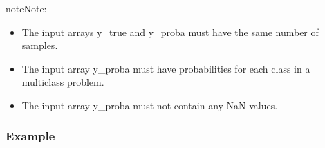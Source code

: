 \documentclass[letterpaper,10pt,english]{sphinxmanual}
\begin{document}
\begin{fulllineitems}
\begin{quote}
\begin{description}
\begin{itemize}
\end{itemize}

\end{description}\end{quote}

\begin{sphinxadmonition}{note}{Note:}\begin{itemize}
\item {} 
\sphinxAtStartPar
The input arrays y\_true and y\_proba must have the same number of samples.

\item {} 
\sphinxAtStartPar
The input array y\_proba must have probabilities for each class in a multiclass problem.

\item {} 
\sphinxAtStartPar
The input array y\_proba must not contain any NaN values.

\end{itemize}
\end{sphinxadmonition}
\subsubsection*{Example}

\begin{sphinxVerbatim}[commandchars=\\\{\}]
  \PYG{p}{[}    \PYG{p}{]}
  \PYG{p}{[}\PYG{p}{[} \PYG{p}{]} \PYG{p}{[} \PYG{p}{]} \PYG{p}{[} \PYG{p}{]} \PYG{p}{[} \PYG{p}{]} \PYG{p}{[} \PYG{p}{]}\PYG{p}{]}
      
\end{sphinxVerbatim}

\end{fulllineitems}

\end{document}
